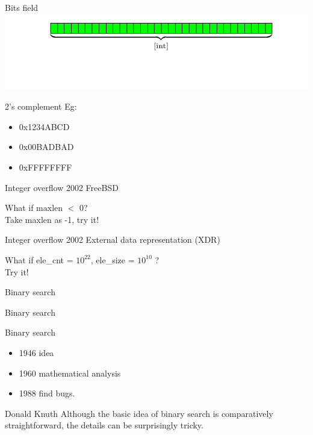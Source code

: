 \documentclass{beamer}
\begin{document}
\begin{CJK*}{UTF8}{bsmi}
    \begin{frame}{Bits field}
        \centering
        \includegraphics[width=\textwidth]{src/mem_layout/mem.pdf}
    \end{frame}

    \begin{frame}{2's complement}
        Eg:
        \begin{itemize}
            \item 0x1234ABCD
            \item 0x00BADBAD
            \item 0xFFFFFFFF
        \end{itemize}
    \end{frame}

    \begin{frame}{Integer overflow}
        2002 FreeBSD
        
        What if maxlen $<$ 0?\\
        Take maxlen as -1, try it!
    \end{frame}

    \begin{frame}{Integer overflow}
        2002 External data representation (XDR)
        
        What if ele\_cnt = $10^{22}$, ele\_size = $10^{10}$ ?\\
        Try it!
    \end{frame}

    \begin{frame}{Binary search}
        
    \end{frame}

    \begin{frame}{Binary search}
        
    \end{frame}

    \begin{frame}{Binary search}
        \begin{itemize}
            \item 1946 idea
            \item 1960 mathematical analysis
            \item 1988 find bugs.
        \end{itemize}
        \begin{block}{Donald Knuth}
            Although the basic idea of binary search is comparatively straightforward, the details can be surprisingly tricky.
        \end{block}
    \end{frame}


\end{CJK*}
\end{document}
